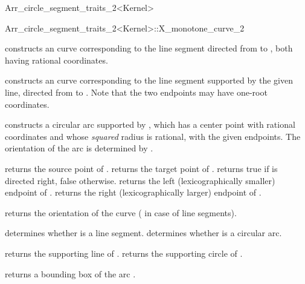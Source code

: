 \begin{ccRefClass}{Arr_circle_segment_traits_2<Kernel>}
\begin{ccClass}{Arr_circle_segment_traits_2<Kernel>::X_monotone_curve_2}
\ccCreation
{}

    {constructs an curve corresponding to the line segment directed
     from  to , both having rational coordinates.}

    {constructs an curve corresponding to the line segment supported by
     the given line, directed from  to .
     Note that the two endpoints may have one-root coordinates.
     }

    {constructs a circular arc supported by , which has a
     center point with rational coordinates and whose {\em squared}
     radius is rational, with the given endpoints. The orientation of the
     arc is determined by .
     }

\ccAccessFunctions

  {returns the source point of \ccVar{}.}
\ccGlue
{}
  {returns the target point of \ccVar{}.}
  {returns true if \ccVar{} is directed right, false otherwise.}
\ccGlue
{}
  {returns the left (lexicographically smaller) endpoint of \ccVar{}.}
\ccGlue
{}
  {returns the right (lexicographically larger) endpoint of \ccVar{}.}

  {returns the orientation of the curve ( in case of
   line segments).}

  {determines whether \ccVar{} is a line segment.}
\ccGlue
{}
  {determines whether \ccVar{} is a circular arc.}

  {returns the supporting line of \ccVar{}.
   }
\ccGlue
{}
  {returns the supporting circle of \ccVar{}.
   }

  {returns a bounding box of the arc \ccVar{}.}

\end{ccClass}

\end{ccRefClass}

\ccRefPageEnd

